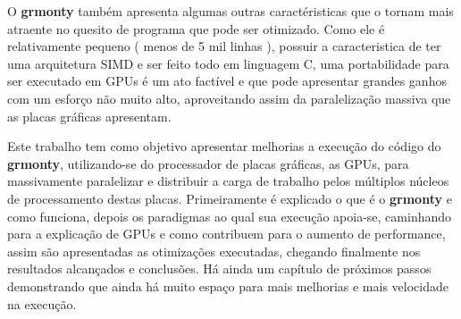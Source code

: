 O \textbf{grmonty} também apresenta algumas outras caractéristicas que o tornam mais atraente no quesito de programa que pode ser otimizado. Como ele é relativamente pequeno ( menos de 5 mil linhas ), possuir a caracteristica de ter uma arquitetura SIMD e ser feito todo em linguagem C, uma portabilidade para ser executado em GPUs é um ato factível e que pode apresentar grandes ganhos com um esforço não muito alto, aproveitando assim da paralelização massiva que as placas gráficas apresentam.

Este trabalho tem como objetivo apresentar melhorias a execução do código do \textbf{grmonty}, utilizando-se do processador de placas gráficas, as GPUs, para massivamente paralelizar e distribuir a carga de trabalho pelos múltiplos núcleos de processamento destas placas. Primeiramente é explicado o que é o \textbf{grmonty} e como funciona, depois os paradigmas ao qual sua execução apoia-se, caminhando para a explicação de GPUs e como contribuem para o aumento de performance, assim são apresentadas as otimizações executadas, chegando finalmente nos resultados alcançados e conclusões. Há ainda um capítulo de próximos passos demonstrando que ainda há muito espaço para mais melhorias e mais velocidade na execução.

%
%
%
%
%
%
%
%

